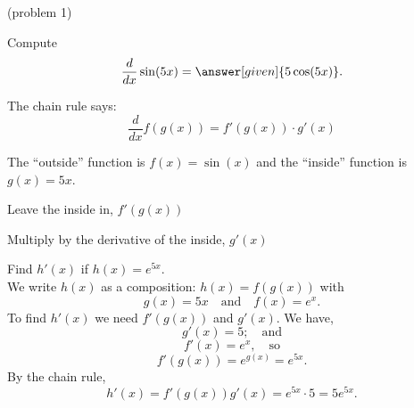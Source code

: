 \documentclass{ximera}
\begin{document}
\begin{center}
\begin{foldable}
\end{foldable}
\end{center}

\begin{problem}(problem 1)
  
Compute
  \[
  \frac{d}{dx} \sin(5x) = \answer[given]{5\cos(5x)}.
  \]
    \begin{hint}
      The chain rule says:
      \[
      \frac{d}{dx} f(g(x)) = f'(g(x))\cdot g'(x)
      \]
    \end{hint}
    \begin{hint}
      The ``outside'' function is $f(x) = \sin(x)$ and the ``inside''
      function is $g(x) = 5x$.
    \end{hint}
    \begin{hint}
		  Leave the inside in, $f'(g(x))$
		\end{hint}
		\begin{hint}
		  Multiply by the derivative of the inside, $g'(x)$
		\end{hint}
	 
\end{problem}



\begin{example}[example 2]

Find $h'(x)$ if $h(x) = e^{5x}$.\\
We write $h(x)$ as a composition: $h(x)=f(g(x))$ with
\[
g(x) = 5x  \quad \text{and} \quad f(x) = e^x.
\]
To find $h'(x)$ we need $f'(g(x))$ and $g'(x)$. We have,
\[
g'(x) = 5; \quad \text{and} 
\]
\[
f'(x) = e^x, \quad \text{so}
\]
\[
f'(g(x)) =e^{g(x)} = e^{5x}.
\]
By the chain rule,
\[
h'(x) = f'(g(x))g'(x) = e^{5x} \cdot 5 = 5e^{5x}.
\]

\end{example}


\begin{center}
\begin{foldable}
\end{foldable}
\end{center}
\end{document}
